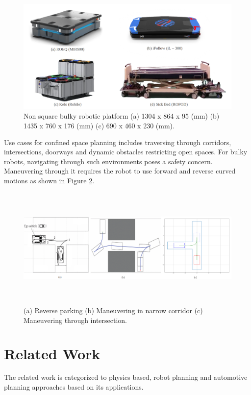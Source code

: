 \documentclass[rnd]{mas_proposal}
\begin{document}
\begin{figure}[!ht]
\centering
\includegraphics[scale=0.33]{images/Robot Platform.png}
\caption{Non square bulky robotic platform (a) 1304 x 864 x 95 (mm) (b) 1435 x 760 x 176 (mm) (c) 690 x 460 x 230 (mm).}
\label{Fig:robot-platform}
\end{figure}

Use cases for confined space planning includes traversing through corridors, intersections, doorways and dynamic obstacles restricting open spaces. For bulky robots, navigating through such environments poses a safety concern. Maneuvering through it requires the robot to use forward and reverse curved motions as shown in Figure \ref{Fig:use-case}. 

\begin{figure}[!ht]
\centering
\includegraphics[width=14.5cm,height=6cm]{images/Use cases.png}
\caption{(a) Reverse parking (b) Maneuvering in narrow corridor (c) Maneuvering through intersection.}
\label{Fig:use-case}
\end{figure}

\section{Related Work}
The related work is categorized to physics based, robot planning and automotive planning approaches based on its applications.
\end{document}
